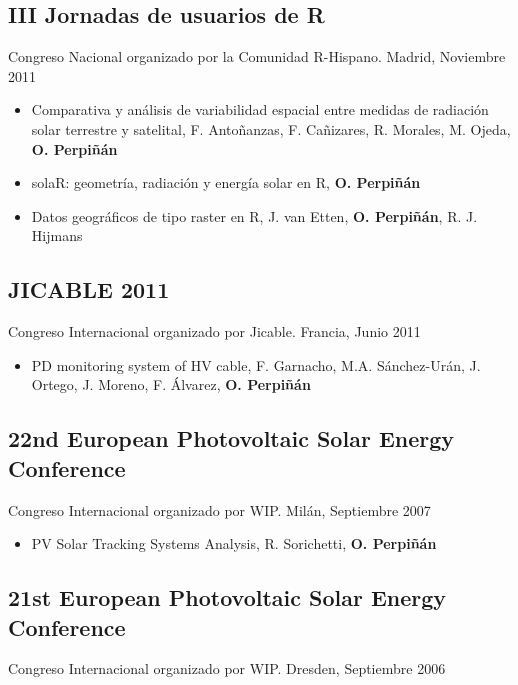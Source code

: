 \documentclass[article, a4paper]{memoir}
\begin{document}
\subsection{III Jornadas de usuarios de R}
\label{sec:orgheadline56}
Congreso Nacional organizado por la Comunidad R-Hispano. Madrid, Noviembre 2011

\begin{itemize}
\item Comparativa y análisis de variabilidad espacial entre medidas de radiación solar terrestre y satelital, F. Antoñanzas, F. Cañizares, R. Morales, M. Ojeda, \textbf{O. Perpiñán}

\item solaR: geometría, radiación y energía solar en R, \textbf{O. Perpiñán}

\item Datos geográficos de tipo raster en R, J. van Etten, \textbf{O. Perpiñán}, R. J. Hijmans
\end{itemize}

\subsection{JICABLE 2011}
\label{sec:orgheadline57}
Congreso Internacional organizado por Jicable. Francia, Junio 2011

\begin{itemize}
\item PD monitoring system of HV cable, F. Garnacho, M.A. Sánchez-Urán, J. Ortego, J. Moreno, F. Álvarez, \textbf{O. Perpiñán}
\end{itemize}

\subsection{22nd European Photovoltaic Solar Energy Conference}
\label{sec:orgheadline58}
Congreso Internacional organizado por WIP. Milán, Septiembre 2007

\begin{itemize}
\item PV Solar Tracking Systems Analysis, R. Sorichetti, \textbf{O. Perpiñán}
\end{itemize}

\subsection{21st European Photovoltaic Solar Energy Conference}
\label{sec:orgheadline59}
Congreso Internacional organizado por WIP. Dresden, Septiembre 2006
\end{document}
